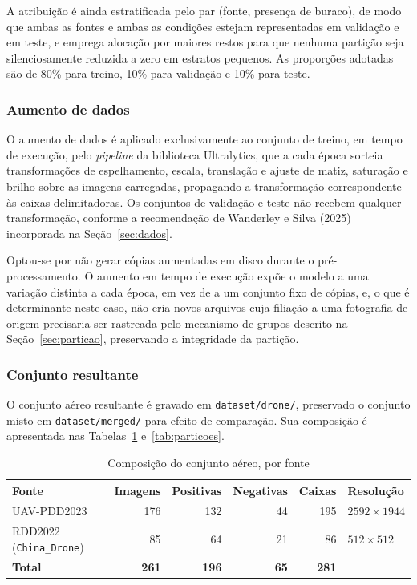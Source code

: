 \documentclass[12pt]{article}
\newcommand{\fonte}[1]{%
  \vspace{2pt}\par\noindent{\footnotesize Fonte: #1}}
\begin{document}
A atribuição é ainda estratificada pelo par (fonte, presença de buraco),
de modo que ambas as fontes e ambas as condições estejam representadas em
validação e em teste, e emprega alocação por maiores restos para que
nenhuma partição seja silenciosamente reduzida a zero em estratos
pequenos. As proporções adotadas são de 80\% para treino, 10\% para
validação e 10\% para teste.

\subsubsection{Aumento de dados}
\label{sec:aumento}

O aumento de dados é aplicado exclusivamente ao conjunto de treino, em
tempo de execução, pelo \emph{pipeline} da biblioteca Ultralytics, que a
cada época sorteia transformações de espelhamento, escala, translação e
ajuste de matiz, saturação e brilho sobre as imagens carregadas,
propagando a transformação correspondente às caixas delimitadoras. Os
conjuntos de validação e teste não recebem qualquer transformação,
conforme a recomendação de Wanderley e Silva (2025) incorporada na
Seção~\ref{sec:dados}.

Optou-se por não gerar cópias aumentadas em disco durante o
pré-processamento. O aumento em tempo de execução expõe o modelo a uma
variação distinta a cada época, em vez de a um conjunto fixo de cópias,
e, o que é determinante neste caso, não cria novos arquivos cuja
filiação a uma fotografia de origem precisaria ser rastreada pelo
mecanismo de grupos descrito na Seção~\ref{sec:particao}, preservando a
integridade da partição.

\subsubsection{Conjunto resultante}
\label{sec:conjunto-resultante}

O conjunto aéreo resultante é gravado em \texttt{dataset/drone/},
preservado o conjunto misto em \texttt{dataset/merged/} para efeito de
comparação. Sua composição é apresentada nas
Tabelas~\ref{tab:composicao} e~\ref{tab:particoes}.

\begin{table}[ht]
\centering
\caption{Composição do conjunto aéreo, por fonte}
\label{tab:composicao}
\small
\setlength{\tabcolsep}{5pt}
\renewcommand{\arraystretch}{1.15}
\begin{tabular}{l r r r r l}
\hline
\textbf{Fonte} & \textbf{Imagens} & \textbf{Positivas} &
\textbf{Negativas} & \textbf{Caixas} & \textbf{Resolução} \\
\hline
UAV-PDD2023 & 176 & 132 & 44 & 195 & $2592 \times 1944$ \\
RDD2022 (\texttt{China\_Drone}) & 85 & 64 & 21 & 86 & $512 \times 512$ \\
\hline
\textbf{Total} & \textbf{261} & \textbf{196} & \textbf{65} &
\textbf{281} & \\
\hline
\end{tabular}
\fonte{elaborado pelo autor, 2026.}
\end{table}
\end{document}

